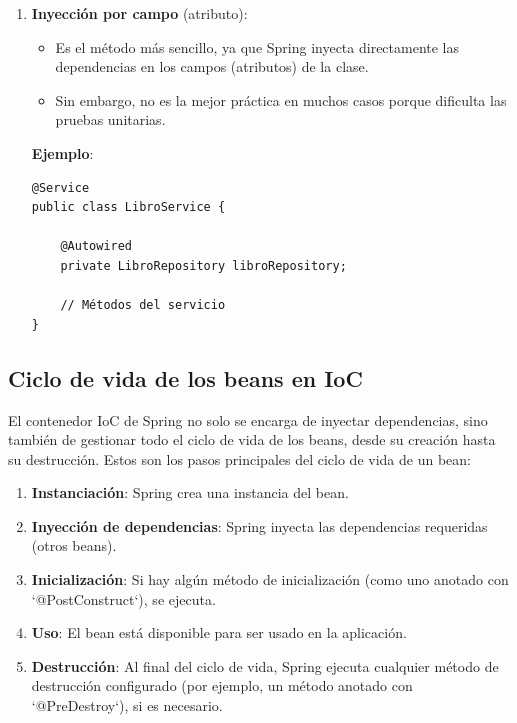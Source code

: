 \documentclass[11pt]{article}
\begin{document}
\begin{enumerate}
\begin{verbatim}
    private LibroRepository libroRepository;

    @Autowired
    public void setLibroRepository(LibroRepository libroRepository) {
        this.libroRepository = libroRepository;
    }

    // Métodos del servicio
}
\end{verbatim}

\item \textbf{\textbf{Inyección por campo}} (atributo):
\begin{itemize}
\item Es el método más sencillo, ya que Spring inyecta directamente las dependencias en los campos (atributos) de la clase.
\item Sin embargo, no es la mejor práctica en muchos casos porque dificulta las pruebas unitarias.
\end{itemize}

\textbf{\textbf{Ejemplo}}:
\begin{verbatim}
@Service
public class LibroService {

    @Autowired
    private LibroRepository libroRepository;

    // Métodos del servicio
}
\end{verbatim}
\end{enumerate}

\subsection{Ciclo de vida de los beans en IoC}
\label{sec:org58968ed}
El contenedor IoC de Spring no solo se encarga de inyectar dependencias, sino también de gestionar todo el ciclo de vida de los beans, desde su creación hasta su destrucción. Estos son los pasos principales del ciclo de vida de un bean:

\begin{enumerate}
\item \textbf{\textbf{Instanciación}}: Spring crea una instancia del bean.
\item \textbf{\textbf{Inyección de dependencias}}: Spring inyecta las dependencias requeridas (otros beans).
\item \textbf{\textbf{Inicialización}}: Si hay algún método de inicialización (como uno anotado con `@PostConstruct`), se ejecuta.
\item \textbf{\textbf{Uso}}: El bean está disponible para ser usado en la aplicación.
\item \textbf{\textbf{Destrucción}}: Al final del ciclo de vida, Spring ejecuta cualquier método de destrucción configurado (por ejemplo, un método anotado con `@PreDestroy`), si es necesario.
\end{enumerate}
\end{document}
